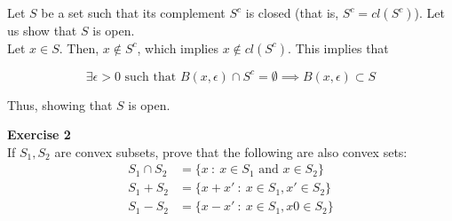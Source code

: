 \documentclass[11pt,table]{article}
\newenvironment{problem}[2][Exercise]
    { \begin{mdframed}[backgroundcolor=gray!20] \textbf{#1 #2} \\}
    {  \end{mdframed}}
\begin{document}
Let \(S\) be a set such that its complement $S^c$ is closed (that is, \(S^c = cl(S^c)\)). Let us show that \(S\) is open. \\

Let \(x \in S\). Then, \(x \notin S^c\), which implies \(x \notin cl(S^c)\). This implies that

\[
\exists \epsilon > 0 \text{ such that } B(x,\epsilon) \cap S^c = \emptyset \implies B(x,\epsilon) \subset S 
\]

Thus, showing that $S$ is open. \\

\begin{problem}{2}
  If \( S_1, S_2 \) are convex subsets, prove that the following are also convex sets:
  \begin{align*}
    S_{1} \cap S_{2} & = \{x \ : \ x \in S_{1} \text{ and } x \in S_{2}\}\\
    S_{1} + S_{2} & = \{x + x' \ : \ x \in S_{1}, x' \in S_{2}\}\\
    S_{1} - S_{2} & = \{x - x' \ : \ x \in S_{1}, x0 \in S_{2}\}
    \end{align*}

\end{problem}
\end{document}

